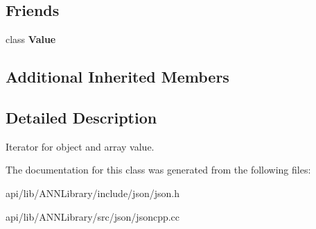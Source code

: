 \subsection*{Friends}
\begin{DoxyCompactItemize}
\item 
class {\bfseries Value}\label{class_json_1_1_value_iterator_a896c037a32087c5c20d97e64a1786880}

\end{DoxyCompactItemize}
\subsection*{Additional Inherited Members}


\subsection{Detailed Description}
Iterator for object and array value. 

The documentation for this class was generated from the following files\+:\begin{DoxyCompactItemize}
\item 
api/lib/\+A\+N\+N\+Library/include/json/json.\+h\item 
api/lib/\+A\+N\+N\+Library/src/json/jsoncpp.\+cc\end{DoxyCompactItemize}
